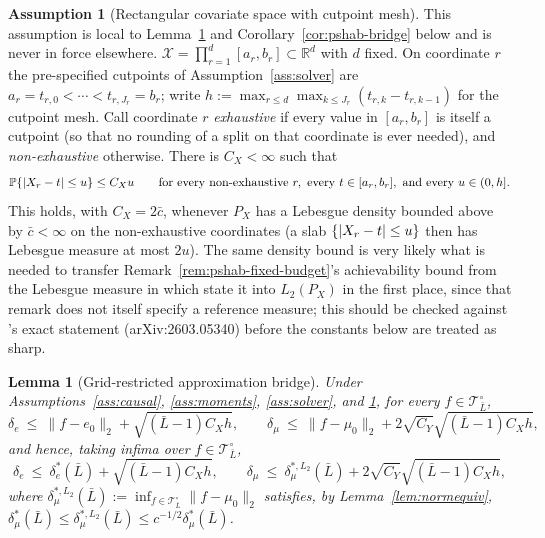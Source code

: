 \documentclass[11pt]{article}
\theoremstyle{plain}
\newtheorem{lemma}[theorem]{Lemma}
\theoremstyle{definition}
\newtheorem{assumption}{Assumption}
\theoremstyle{remark}
\newcommand{\PP}{\mathbb{P}}
\newcommand{\R}{\mathbb{R}}
\newcommand{\cX}{\mathcal{X}}
\newcommand{\cT}{\mathcal{T}}
\newcommand{\ez}{e_0}
\newcommand{\mz}{\mu_0}
\newcommand{\Ltwo}[1]{\lVert #1 \rVert_{2}}
\DeclarePairedDelimiter{\abs}{\lvert}{\rvert}
\begin{document}
\begin{assumption}[Rectangular covariate space with cutpoint mesh]
\label{ass:bridge-mesh}
This assumption is local to Lemma~\ref{lem:pshab-bridge} and
Corollary~\ref{cor:pshab-bridge} below and is never in force elsewhere.
$\cX=\prod_{r=1}^d[a_r,b_r]\subset\R^d$ with $d$ fixed. On coordinate $r$ the
pre-specified cutpoints of Assumption~\ref{ass:solver} are
$a_r=t_{r,0}<\cdots<t_{r,J_r}=b_r$; write
$h:=\max_{r\le d}\max_{k\le J_r}(t_{r,k}-t_{r,k-1})$ for the cutpoint mesh.
Call coordinate $r$ \emph{exhaustive} if every value in $[a_r,b_r]$ is itself
a cutpoint (so that no rounding of a split on that coordinate is ever
needed), and \emph{non-exhaustive} otherwise. There is $C_X<\infty$ such
that
\[
  \PP\{\abs{X_r-t}\le u\}\le C_Xu
  \qquad\text{for every non-exhaustive }r,\ \text{every }t\in[a_r,b_r],
  \ \text{and every }u\in(0,h] .
\]
This holds, with $C_X=2\bar c$, whenever $P_X$ has a Lebesgue density bounded
above by $\bar c<\infty$ on the non-exhaustive coordinates (a slab
$\{\abs{X_r-t}\le u\}$ then has Lebesgue measure at most $2u$). The same
density bound is very likely what is needed to transfer
Remark~\ref{rem:pshab-fixed-budget}'s achievability bound from the Lebesgue
measure in which \citet{xu2026} state it into $L_2(P_X)$ in the first place,
since that remark does not itself specify a reference measure; this should
be checked against \citet{xu2026}'s exact statement (arXiv:2603.05340)
before the constants below are treated as sharp.
\end{assumption}

\begin{lemma}[Grid-restricted approximation bridge]\label{lem:pshab-bridge}
Under Assumptions~\ref{ass:causal}, \ref{ass:moments}, \ref{ass:solver}, and
\ref{ass:bridge-mesh}, for every $f\in\cT_{\bar L}^\circ$,
\[
  \delta_e\ \le\ \Ltwo{f-\ez}+\sqrt{(\bar L-1)C_Xh},
  \qquad
  \delta_\mu\ \le\ \Ltwo{f-\mz}+2\sqrt{C_Y}\sqrt{(\bar L-1)C_Xh},
\]
and hence, taking infima over $f\in\cT_{\bar L}^\circ$,
\[
  \delta_e\ \le\ \delta_e^*(\bar L)+\sqrt{(\bar L-1)C_Xh},
  \qquad
  \delta_\mu\ \le\ \delta_\mu^{*,L_2}(\bar L)+2\sqrt{C_Y}\sqrt{(\bar L-1)C_Xh},
\]
where $\delta_\mu^{*,L_2}(\bar L):=\inf_{f\in\cT_{\bar L}^\circ}\Ltwo{f-\mz}$
satisfies, by Lemma~\ref{lem:normequiv},
$\delta_\mu^*(\bar L)\le\delta_\mu^{*,L_2}(\bar L)\le c^{-1/2}\delta_\mu^*(\bar L)$.
\end{lemma}
\end{document}
